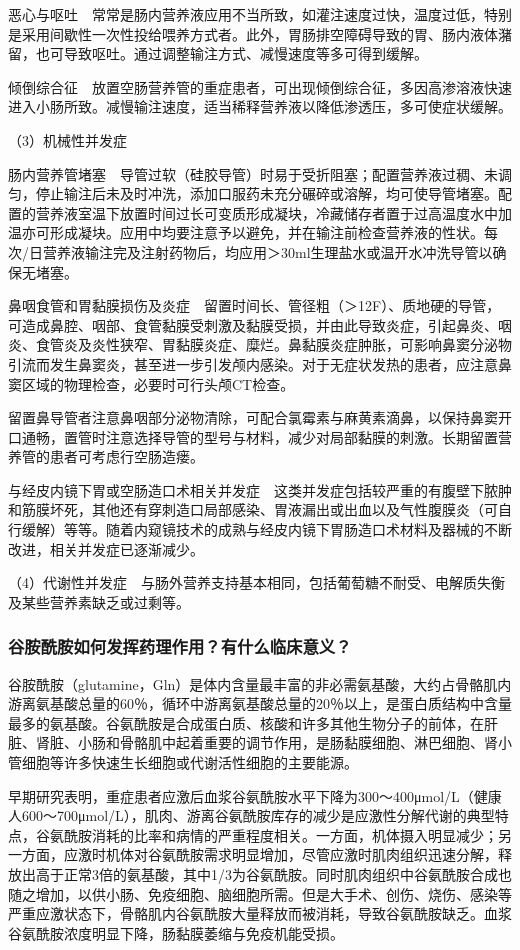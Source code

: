恶心与呕吐　常常是肠内营养液应用不当所致，如灌注速度过快，温度过低，特别是采用间歇性一次性投给喂养方式者。此外，胃肠排空障碍导致的胃、肠内液体潴留，也可导致呕吐。通过调整输注方式、减慢速度等多可得到缓解。

倾倒综合征　放置空肠营养管的重症患者，可出现倾倒综合征，多因高渗溶液快速进入小肠所致。减慢输注速度，适当稀释营养液以降低渗透压，多可使症状缓解。

（3）机械性并发症

肠内营养管堵塞　导管过软（硅胶导管）时易于受折阻塞；配置营养液过稠、未调匀，停止输注后未及时冲洗，添加口服药未充分碾碎或溶解，均可使导管堵塞。配置的营养液室温下放置时间过长可变质形成凝块，冷藏储存者置于过高温度水中加温亦可形成凝块。应用中均要注意予以避免，并在输注前检查营养液的性状。每次/日营养液输注完及注射药物后，均应用＞30ml生理盐水或温开水冲洗导管以确保无堵塞。

鼻咽食管和胃黏膜损伤及炎症　留置时间长、管径粗（＞12F）、质地硬的导管，可造成鼻腔、咽部、食管黏膜受刺激及黏膜受损，并由此导致炎症，引起鼻炎、咽炎、食管炎及炎性狭窄、胃黏膜炎症、糜烂。鼻黏膜炎症肿胀，可影响鼻窦分泌物引流而发生鼻窦炎，甚至进一步引发颅内感染。对于无症状发热的患者，应注意鼻窦区域的物理检查，必要时可行头颅CT检查。

留置鼻导管者注意鼻咽部分泌物清除，可配合氯霉素与麻黄素滴鼻，以保持鼻窦开口通畅，置管时注意选择导管的型号与材料，减少对局部黏膜的刺激。长期留置营养管的患者可考虑行空肠造瘘。

与经皮内镜下胃或空肠造口术相关并发症　这类并发症包括较严重的有腹壁下脓肿和筋膜坏死，其他还有穿刺造口局部感染、胃液漏出或出血以及气性腹膜炎（可自行缓解）等等。随着内窥镜技术的成熟与经皮内镜下胃肠造口术材料及器械的不断改进，相关并发症已逐渐减少。

（4）代谢性并发症　与肠外营养支持基本相同，包括葡萄糖不耐受、电解质失衡及某些营养素缺乏或过剩等。

\subsubsection{谷胺酰胺如何发挥药理作用？有什么临床意义？}

谷胺酰胺（glutamine，Gln）是体内含量最丰富的非必需氨基酸，大约占骨骼肌内游离氨基酸总量的60％，循环中游离氨基酸总量的20％以上，是蛋白质结构中含量最多的氨基酸。谷氨酰胺是合成蛋白质、核酸和许多其他生物分子的前体，在肝脏、肾脏、小肠和骨骼肌中起着重要的调节作用，是肠黏膜细胞、淋巴细胞、肾小管细胞等许多快速生长细胞或代谢活性细胞的主要能源。

早期研究表明，重症患者应激后血浆谷氨酰胺水平下降为300～400μmol/L（健康人600～700μmol/L），肌肉、游离谷氨酰胺库存的减少是应激性分解代谢的典型特点，谷氨酰胺消耗的比率和病情的严重程度相关。一方面，机体摄入明显减少；另一方面，应激时机体对谷氨酰胺需求明显增加，尽管应激时肌肉组织迅速分解，释放出高于正常3倍的氨基酸，其中1/3为谷氨酰胺。同时肌肉组织中谷氨酰胺合成也随之增加，以供小肠、免疫细胞、脑细胞所需。但是大手术、创伤、烧伤、感染等严重应激状态下，骨骼肌内谷氨酰胺大量释放而被消耗，导致谷氨酰胺缺乏。血浆谷氨酰胺浓度明显下降，肠黏膜萎缩与免疫机能受损。

